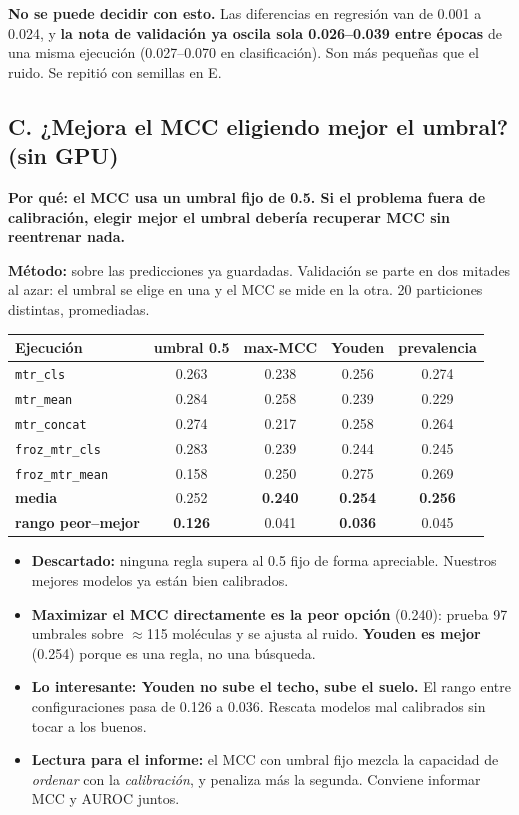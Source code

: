 \documentclass[11pt,a4paper]{article}
\newcommand{\var}[1]{\texttt{#1}}
\newcommand{\exper}[2]{\subsection*{#1}\noindent\textbf{\small\textcolor{dtured}{#2}}\par\smallskip}
\begin{document}
\begin{concl}
\textbf{No se puede decidir con esto.} Las diferencias en regresión van de 0.001 a 0.024, y
\textbf{la nota de validación ya oscila sola 0.026--0.039 entre épocas} de una misma ejecución
(0.027--0.070 en clasificación). Son más pequeñas que el ruido. Se repitió con semillas en E.
\end{concl}

\exper{C. ¿Mejora el MCC eligiendo mejor el umbral? (sin GPU)}
{Por qué: el MCC usa un umbral fijo de 0.5. Si el problema fuera de calibración, elegir mejor el umbral debería recuperar MCC sin reentrenar nada.}

\textbf{Método:} sobre las predicciones ya guardadas. Validación se parte en dos mitades al azar: el
umbral se elige en una y el MCC se mide en la otra. 20 particiones distintas, promediadas.

\begin{center}
\begin{tabular}{lcccc}
\toprule
Ejecución & umbral 0.5 & max-MCC & Youden & prevalencia \\ \midrule
\var{mtr\_cls}        & 0.263 & 0.238 & 0.256 & 0.274 \\
\var{mtr\_mean}       & 0.284 & 0.258 & 0.239 & 0.229 \\
\var{mtr\_concat}     & 0.274 & 0.217 & 0.258 & 0.264 \\
\var{froz\_mtr\_cls}  & 0.283 & 0.239 & 0.244 & 0.245 \\
\var{froz\_mtr\_mean} & 0.158 & 0.250 & 0.275 & 0.269 \\ \midrule
\textbf{media} & 0.252 & \textbf{0.240} & \textbf{0.254} & \textbf{0.256} \\
\textbf{rango peor--mejor} & \textbf{0.126} & 0.041 & \textbf{0.036} & 0.045 \\
\bottomrule
\end{tabular}
\end{center}

\begin{concl}
\begin{itemize}
  \item \textbf{Descartado:} ninguna regla supera al 0.5 fijo de forma apreciable. Nuestros mejores
        modelos ya están bien calibrados.
  \item \textbf{Maximizar el MCC directamente es la peor opción} (0.240): prueba 97 umbrales sobre
        $\approx$115 moléculas y se ajusta al ruido. \textbf{Youden es mejor} (0.254) porque es una
        regla, no una búsqueda.
  \item \textbf{Lo interesante: Youden no sube el techo, sube el suelo.} El rango entre
        configuraciones pasa de 0.126 a 0.036. Rescata modelos mal calibrados sin tocar a los buenos.
  \item \textbf{Lectura para el informe:} el MCC con umbral fijo mezcla la capacidad de \emph{ordenar}
        con la \emph{calibración}, y penaliza más la segunda. Conviene informar MCC y AUROC juntos.
\end{itemize}
\end{concl}
\end{document}
